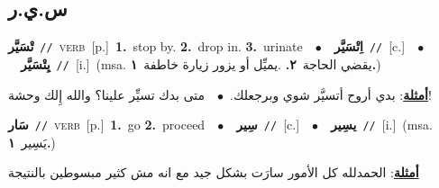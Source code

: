 \documentclass[10pt,a4paper,twoside]{article} %
\begin{document}
\begin{multicols}{2}
\vspace{-3mm}
\subsection*{\color{blue}\foreignlanguage{arabic}{س.ي.ر}\color{blue}{}} 

{\setlength\topsep{0pt}\textbf{\foreignlanguage{arabic}{تْسَيَّر}}\ {\color{gray}\texttt{//}\color{black}}\ \textsc{verb}\ [p.]\ \textbf{1.}~stop by.  \textbf{2.}~drop in.  \textbf{3.}~urinate\ \ $\bullet$\ \ \setlength\topsep{0pt}\textbf{\foreignlanguage{arabic}{اِتْسَيَّر}}\ {\color{gray}\texttt{//}\color{black}}\ [c.]\ \ $\bullet$\ \ \setlength\topsep{0pt}\textbf{\foreignlanguage{arabic}{يِتْسَيَّر}}\ {\color{gray}\texttt{//}\color{black}}\ [i.]\ \color{gray}(msa. \foreignlanguage{arabic}{يقضي الحاجة}~\foreignlanguage{arabic}{\textbf{٢.}}  .\foreignlanguage{arabic}{يميِّل أو يزور زيارة خاطفة}~\foreignlanguage{arabic}{\textbf{١.}})\color{black}\  \begin{flushright}\color{gray}\foreignlanguage{arabic}{\textbf{\underline{\foreignlanguage{arabic}{أمثلة}}}: بدي أروح أتسيَّر شوي وبرجعلك.\ $\bullet$\ \  متى بدك تسيِّر علينا؟ والله إِلك وحشة!}\end{flushright}\color{black}} \vspace{2mm}

{\setlength\topsep{0pt}\textbf{\foreignlanguage{arabic}{سَار}}\ {\color{gray}\texttt{//}\color{black}}\ \textsc{verb}\ [p.]\ \textbf{1.}~go  \textbf{2.}~proceed\ \ $\bullet$\ \ \setlength\topsep{0pt}\textbf{\foreignlanguage{arabic}{سِير}}\ {\color{gray}\texttt{//}\color{black}}\ [c.]\ \ $\bullet$\ \ \setlength\topsep{0pt}\textbf{\foreignlanguage{arabic}{يسِير}}\ {\color{gray}\texttt{//}\color{black}}\ [i.]\ \color{gray}(msa. \foreignlanguage{arabic}{يَسِير}~\foreignlanguage{arabic}{\textbf{١.}})\color{black}\  \begin{flushright}\color{gray}\foreignlanguage{arabic}{\textbf{\underline{\foreignlanguage{arabic}{أمثلة}}}: الحمدلله كل الأمور سارَت بشكل جيد مع انه مش كثير مبسوطين بالنتيجة}\end{flushright}\color{black}} \vspace{2mm}


\end{multicols}
\end{document}
